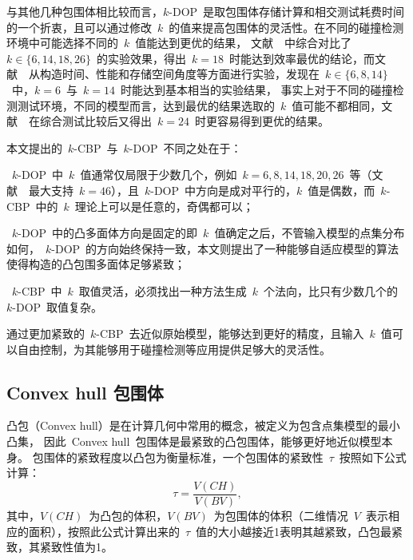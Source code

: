 与其他几种包围体相比较而言，$k$-DOP~是取包围体存储计算和相交测试耗费时间的一个折衷，且可以通过修改~$k$~的值来提高包围体的灵活性。在不同的碰撞检测环境中可能选择不同的~$k$~值能达到更优的结果，
文献~~中综合对比了~$k \in \{6,14,18,26\}$~的实验效果，得出~$k=18$~时能达到效率最优的结论，而文献~~从构造时间、性能和存储空间角度等方面进行实验，发现在~$k \in \{6,8,14\}$~中，$k=6$~与~$k=14$~时能达到基本相当的实验结果，
事实上对于不同的碰撞检测测试环境，不同的模型而言，达到最优的结果选取的~$k$~值可能不都相同，文献~~在综合测试比较后又得出~$k=24$~时更容易得到更优的结果。

本文提出的~$k$-CBP~与~$k$-DOP~不同之处在于：\\ \indent
\begin{inparaenum}[(1)]
\item ~$k$-DOP~中~$k$~值通常仅局限于少数几个，例如~$k=6,8,14,18,20,26$~等\cite{klosowski1998efficient}（文献~~最大支持~$k=46$），且~$k$-DOP~中方向是成对平行的，$k$~值是偶数，而~$k$-CBP~中的~$k$~理论上可以是任意的，奇偶都可以；\\ \indent
\item ~$k$-DOP~中的凸多面体方向是固定的即~$k$~值确定之后，不管输入模型的点集分布如何，~$k$-DOP~的方向始终保持一致，本文则提出了一种能够自适应模型的算法使得构造的凸包围多面体足够紧致；\\ \indent
\item ~$k$-CBP~中~$k$~取值灵活，必须找出一种方法生成~$k$~个法向，比只有少数几个的~$k$-DOP~取值复杂。\\ \indent
\end{inparaenum} 
通过更加紧致的~$k$-CBP~去近似原始模型，能够达到更好的精度，且输入~$k$~值可以自由控制，为其能够用于碰撞检测等应用提供足够大的灵活性。

\subsection{Convex hull 包围体}
\label{subsec:convexhull}

凸包（Convex hull）是在计算几何中常用的概念，被定义为包含点集模型的最小凸集\cite{dengcg}，
因此~Convex hull~包围体是最紧致的凸包围体，能够更好地近似模型本身。
包围体的紧致程度以凸包为衡量标准，一个包围体的紧致性~$\tau$~按照如下公式计算：
\begin{equation}
\label{equa:judge:tightness}
\tau = \frac{V(CH)}{V(BV)},
\end{equation}
其中，$V(CH)$~为凸包的体积，$V(BV)$~为包围体的体积（二维情况~$V$~表示相应的面积），按照此公式计算出来的~$\tau$~值的大小越接近1表明其越紧致，凸包最紧致，其紧致性值为1。

